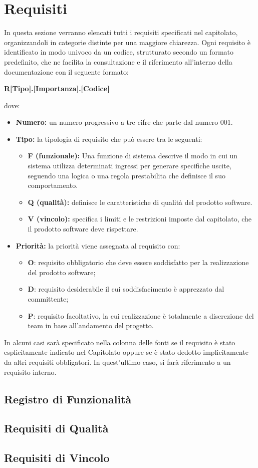 \section{Requisiti}
In questa sezione verranno elencati tutti i requisiti specificati nel capitolato, organizzandoli in categorie distinte per una maggiore chiarezza. Ogni requisito è identificato in modo univoco da un codice, strutturato secondo un formato predefinito, che ne facilita la consultazione e il riferimento all'interno della documentazione con il seguente formato: 
\begin{center}
\textbf{R[Tipo].[Importanza].[Codice]}
\end{center}
dove:
\begin{itemize}
    \item \textbf{Numero:} un numero progressivo a tre cifre che parte dal numero 001.
    \item \textbf{Tipo:} la tipologia di requisito che può essere tra le seguenti:
    \begin{itemize}[label=-]
        \item \textbf{F (funzionale):} Una funzione di sistema descrive il modo in cui un sistema utilizza determinati ingressi per generare specifiche uscite, seguendo una logica o una regola prestabilita che definisce il suo comportamento.
        \item \textbf{Q (qualità):} definisce le caratteristiche di qualità del prodotto software.
        \item \textbf{V (vincolo):} specifica i limiti e le restrizioni imposte dal capitolato, che il prodotto software deve rispettare.
\end{itemize}
    \item \textbf{Priorità:} la priorità viene assegnata al requisito con:
    \begin{itemize}
     \item \textbf{O}: requisito obbligatorio che deve essere soddisfatto per la realizzazione del prodotto software;
        \item \textbf{D}: requisito desiderabile il cui soddisfacimento è apprezzato dal committente;
        \item \textbf{P}: requisito facoltativo, la cui realizzazione è totalmente a discrezione del team in base all'andamento del progetto.
    \end{itemize}
\end{itemize}
In alcuni casi sarà specificato nella colonna delle fonti se il requisito è stato esplicitamente indicato nel Capitolato oppure se è stato dedotto implicitamente da altri requisiti obbligatori. In quest’ultimo caso, si farà riferimento a un requisito interno.
\subsection{Registro di Funzionalità}

\subsection{Requisiti di Qualità}

\subsection{Requisiti di Vincolo}
